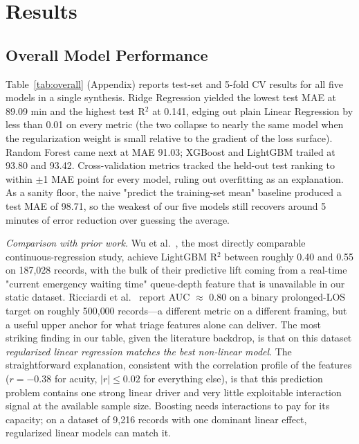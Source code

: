 \documentclass[conference]{IEEEtran}
\begin{document}
\section{Results}\label{sec:results}

\subsection{Overall Model Performance}
Table~\ref{tab:overall} (Appendix) reports test-set and 5-fold CV results
for all five models in a single synthesis. Ridge Regression yielded the
lowest test MAE at 89.09 min and the highest test R$^2$ at 0.141, edging
out plain Linear Regression by less than 0.01 on every metric (the two
collapse to nearly the same model when the regularization weight is small
relative to the gradient of the loss surface). Random Forest came next at
MAE 91.03; XGBoost and LightGBM trailed at 93.80 and 93.42. Cross-validation
metrics tracked the held-out test ranking to within $\pm$1 MAE point for
every model, ruling out overfitting as an explanation. As a sanity floor,
the naive "predict the training-set mean" baseline produced a test MAE of
98.71, so the weakest of our five models still recovers around 5 minutes of
error reduction over guessing the average.

\textit{Comparison with prior work.} Wu et al.~\cite{wu2025}, the most
directly comparable continuous-regression study, achieve LightGBM R$^2$
between roughly 0.40 and 0.55 on 187{,}028 records, with the bulk of their
predictive lift coming from a real-time "current emergency waiting time"
queue-depth feature that is unavailable in our static dataset.
Ricciardi et al.~\cite{ricciardi2024} report AUC $\approx$ 0.80 on a binary
prolonged-LOS target on roughly 500{,}000 records---a different metric on a
different framing, but a useful upper anchor for what triage features alone
can deliver. The most striking finding in our table, given the literature
backdrop, is that on this dataset \emph{regularized linear regression
matches the best non-linear model}. The straightforward explanation,
consistent with the correlation profile of the features ($r=-0.38$ for
acuity, $|r|\leq 0.02$ for everything else), is that this prediction problem
contains one strong linear driver and very little exploitable interaction
signal at the available sample size. Boosting needs interactions to pay for
its capacity; on a dataset of 9{,}216 records with one dominant linear
effect, regularized linear models can match it.
\end{document}
